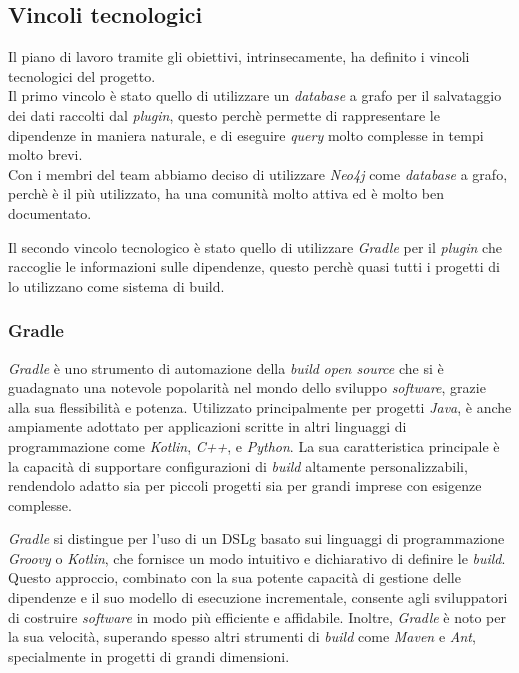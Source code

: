   \subsection*{ Vincoli tecnologici}

  Il piano di lavoro tramite gli obiettivi, intrinsecamente, ha definito i vincoli tecnologici del progetto.\\
  Il primo vincolo è stato quello di utilizzare un \textit{database} a grafo per il salvataggio dei dati raccolti dal \textit{plugin},
  questo perchè permette di rappresentare le dipendenze in maniera naturale, e di eseguire \textit{query} molto complesse in tempi molto brevi.\\
  Con i membri del team abbiamo deciso di utilizzare \textit{Neo4j} come \textit{database} a grafo, perchè è il più utilizzato, ha una comunità molto attiva
ed è molto ben documentato.

Il secondo vincolo tecnologico è stato quello di utilizzare \textit{Gradle} per il \textit{plugin} che raccoglie le informazioni sulle dipendenze,
questo perchè quasi tutti i progetti di {\azienda} lo utilizzano come sistema di build.\\

\subsubsection*{Gradle}
  \textit{Gradle} è uno strumento di automazione della \textit{build} \textit{open source} che si è guadagnato una notevole popolarità nel mondo 
dello sviluppo \textit{software}, grazie alla sua flessibilità e potenza. Utilizzato principalmente per progetti \textit{Java}, 
è anche ampiamente adottato per applicazioni scritte in altri linguaggi di programmazione come \textit{Kotlin}, \textit{C++}, e \textit{Python}. 
La sua caratteristica principale è la capacità di supportare configurazioni di \textit{build} altamente personalizzabili, 
rendendolo adatto sia per piccoli progetti sia per grandi imprese con esigenze complesse.

\textit{Gradle} si distingue per l'uso di un \gls{DSLg} basato sui linguaggi di programmazione \textit{Groovy} o \textit{Kotlin},
 che fornisce un modo intuitivo e dichiarativo di definire le \textit{build}. Questo approccio, combinato con la sua potente capacità di 
 gestione delle dipendenze e il suo modello di esecuzione incrementale, consente agli sviluppatori di costruire \textit{software} in modo più 
 efficiente e affidabile. Inoltre, \textit{Gradle} è noto per la sua velocità, superando spesso altri strumenti di \textit{build} come \textit{Maven} 
 e \textit{Ant}, specialmente in progetti di grandi dimensioni.

